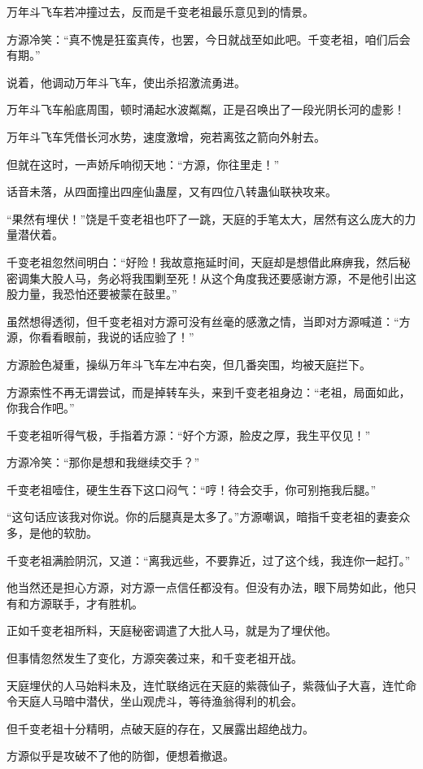 \begin{this_body}
万年斗飞车若冲撞过去，反而是千变老祖最乐意见到的情景。

方源冷笑：“真不愧是狂蛮真传，也罢，今日就战至如此吧。千变老祖，咱们后会有期。”

说着，他调动万年斗飞车，使出杀招激流勇进。

万年斗飞车船底周围，顿时涌起水波粼粼，正是召唤出了一段光阴长河的虚影！

万年斗飞车凭借长河水势，速度激增，宛若离弦之箭向外射去。

但就在这时，一声娇斥响彻天地：“方源，你往里走！”

话音未落，从四面撞出四座仙蛊屋，又有四位八转蛊仙联袂攻来。

“果然有埋伏！”饶是千变老祖也吓了一跳，天庭的手笔太大，居然有这么庞大的力量潜伏着。

千变老祖忽然间明白：“好险！我故意拖延时间，天庭却是想借此麻痹我，然后秘密调集大股人马，务必将我围剿至死！从这个角度我还要感谢方源，不是他引出这股力量，我恐怕还要被蒙在鼓里。”

虽然想得透彻，但千变老祖对方源可没有丝毫的感激之情，当即对方源喊道：“方源，你看看眼前，我说的话应验了！”

方源脸色凝重，操纵万年斗飞车左冲右突，但几番突围，均被天庭拦下。

方源索性不再无谓尝试，而是掉转车头，来到千变老祖身边：“老祖，局面如此，你我合作吧。”

千变老祖听得气极，手指着方源：“好个方源，脸皮之厚，我生平仅见！”

方源冷笑：“那你是想和我继续交手？”

千变老祖噎住，硬生生吞下这口闷气：“哼！待会交手，你可别拖我后腿。”

“这句话应该我对你说。你的后腿真是太多了。”方源嘲讽，暗指千变老祖的妻妾众多，是他的软肋。

千变老祖满脸阴沉，又道：“离我远些，不要靠近，过了这个线，我连你一起打。”

他当然还是担心方源，对方源一点信任都没有。但没有办法，眼下局势如此，他只有和方源联手，才有胜机。

正如千变老祖所料，天庭秘密调遣了大批人马，就是为了埋伏他。

但事情忽然发生了变化，方源突袭过来，和千变老祖开战。

天庭埋伏的人马始料未及，连忙联络远在天庭的紫薇仙子，紫薇仙子大喜，连忙命令天庭人马暗中潜伏，坐山观虎斗，等待渔翁得利的机会。

但千变老祖十分精明，点破天庭的存在，又展露出超绝战力。

方源似乎是攻破不了他的防御，便想着撤退。


\end{this_body}
